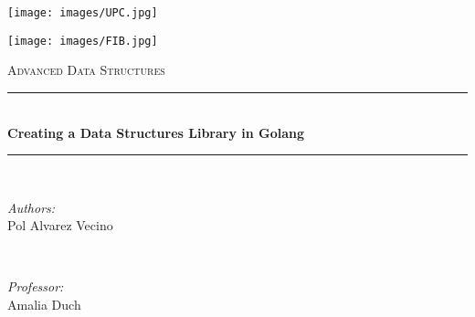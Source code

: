 \documentclass[a4paper,10pt,table,xcdraw]{article}
\begin{document}
\begin{titlepage}
  \newcommand{\HRule}{\rule{\linewidth}{0.5mm}}

  \center %

  \begin{minipage}[c]{0.4\linewidth}
    \hspace{0.12\linewidth}%
    \texttt{[image: images/UPC.jpg]}
  \end{minipage}%
  \hspace{0.1\linewidth}%
  \begin{minipage}[c]{0.4\linewidth}
    \texttt{[image: images/FIB.jpg]}
  \end{minipage}

  \vspace{4em}

  \textsc{\LARGE Advanced Data Structures}\\[0.5cm] %

  \HRule \\[0.4cm]
         { \huge \bfseries Creating a Data Structures Library in Golang}\\[0.4cm] %
         \HRule \\[7.5cm]
         
         \begin{minipage}[t]{0.55\textwidth}
           \begin{flushleft}%
             \emph{Authors:}\\
             Pol Alvarez Vecino \\
           \end{flushleft}
         \end{minipage}
         ~
         \begin{minipage}[t]{0.4\textwidth}
           \begin{flushright}%
             \emph{Professor:} \\
             Amalia Duch
           \end{flushright}
         \end{minipage}\\[1.5cm]


\end{titlepage}
\end{document}
